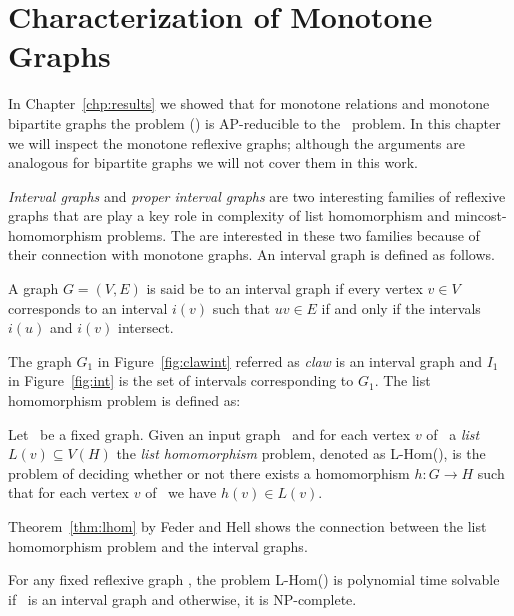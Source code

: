 \chapter{Characterization of Monotone Graphs}
In Chapter~\ref{chp:results} we showed that for monotone relations and monotone
bipartite graphs the problem \ccsp(\mH) is AP-reducible to the \cbis\ problem. In this chapter we will
inspect the monotone reflexive graphs; although the arguments are
analogous for bipartite graphs we will not cover them in this work.

\emph{Interval graphs} and \emph{proper interval graphs}
are two interesting families of reflexive graphs that are play a key role in complexity of 
list homomorphism and mincost-homomorphism problems. The are interested in these two families
because of their connection with monotone graphs. An interval graph is defined as follows.

\begin{defi}
A graph \(G=(V,E)\) is said be to an interval graph if every vertex \(v \in V\)
corresponds to an interval \(i(v)\) such that \(uv \in E\) if and only if the intervals
\(i(u)\) and \(i(v)\) intersect.
\end{defi}

\begin{figure} [h]
\hfill
\subfigure[\ensuremath{G_1}]{\label{fig:clawint}}\hfill 
\subfigure[\ensuremath{I_1}]{\label{fig:int}}\hfill 
\end{figure}

The graph \(G_1\) in Figure~\ref{fig:clawint} referred as \emph{claw} is an interval graph
and \(I_1\) in Figure~\ref{fig:int} is the set of intervals corresponding to \(G_1\)\@.
The list homomorphism problem is defined as:

\begin{defi} [L-Hom]
Let \mH\ be a fixed graph. Given an input graph \mG\ and for each vertex \(v\) of \mG\
a \emph{list} \(L(v) \subseteq V(H)\) the \emph{list homomorphism} problem, denoted
as L-Hom(\mH), is the problem of  deciding whether or not
there exists a homomorphism \(h: G\to H\) such that for each vertex \(v\) of \mG\ 
we have \(h(v)\in L(v)\)\@.
\end{defi}

Theorem~\ref{thm:lhom} by Feder and Hell shows the connection between the list homomorphism
problem and the interval graphs.

\begin{theorem} [Feder and Hell 1996 \cite{listhom}] \label{thm:lhom}
For any fixed reflexive graph \mH, the problem L-Hom(\mH) is polynomial time solvable if
\mH\ is an interval graph and otherwise, it is NP-complete.
\end{theorem}

